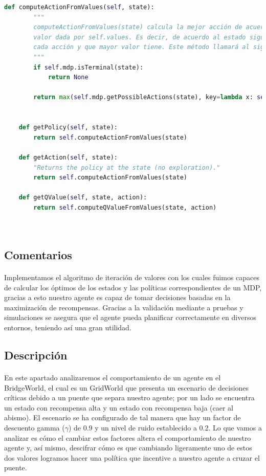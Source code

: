 \documentclass{report}
\begin{document}
\begin{lstlisting}[language=Python, caption=Iteración de valores]
    def computeActionFromValues(self, state):
        """
        computeActionFromValues(state) calcula la mejor acción de acuerdo con la función de
        valor dada por self.values. Es decir, de acuerdo al estado siguiente al que nos lleva
        cada acción y que mayor valor tiene. Este método llamará al siguiente.
        """
        if self.mdp.isTerminal(state):
            return None

        return max(self.mdp.getPossibleActions(state), key=lambda x: self.computeQValueFromValues(state, x))
        

    def getPolicy(self, state):
        return self.computeActionFromValues(state)

    def getAction(self, state):
        "Returns the policy at the state (no exploration)."
        return self.computeActionFromValues(state)

    def getQValue(self, state, action):
        return self.computeQValueFromValues(state, action)

    
\end{lstlisting}
      \subsection*{Comentarios}
        \paragraph*{}{
          Implementamos el algoritmo de iteración de valores con los cuales fuimos capaces de calcular los óptimos de los estados y las políticas correspondientes de un MDP, gracias a esto nuestro agente es capaz de tomar decisiones basadas en la maximización de recompensas. Gracias a la validación mediante a pruebas y simulaciones se asegura que el agente pueda planificar correctamente en diversos entornos, teniendo así una gran utilidad.
        }
      \subsection*{Descripción}
        \paragraph*{}{
          En este apartado analizaremos el comportamiento de un agente en el BridgeWorld, el cual es un GridWorld que presenta un escenario de decisiones críticas debido a un puente que separa nuestro agente; por un lado se encuentra un estado con recompensa alta y un estado con recompensa baja (caer al abismo).
          El escenario se ha configurado de tal manera que hay un factor de descuento gamma (\(\gamma\)) de 0.9 y un nivel de ruido establecido a 0.2.
          Lo que vamos a analizar es cómo el cambiar estos factores altera el comportamiento de nuestro agente y, así mismo, descifrar cómo es que cambiando ligeramente uno de estos dos valores logramos hacer una política que incentive a nuestro agente a cruzar el puente.
        }
\end{document}
